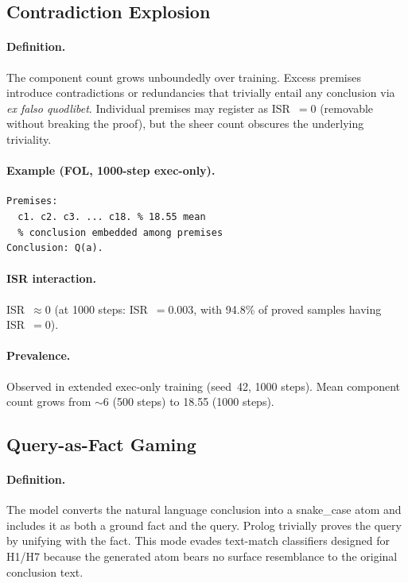 \subsection{Contradiction Explosion}

\paragraph{Definition.}
The component count grows unboundedly over training.
Excess premises introduce contradictions or redundancies that trivially entail any conclusion via \emph{ex falso quodlibet}.
Individual premises may register as ISR~$=0$ (removable without breaking the proof), but the sheer count obscures the underlying triviality.

\paragraph{Example (FOL, 1000-step exec-only).}
{\small\begin{verbatim}
Premises:
  c1. c2. c3. ... c18. % 18.55 mean
  % conclusion embedded among premises
Conclusion: Q(a).
\end{verbatim}}

\paragraph{ISR interaction.}
ISR~$\approx 0$ (at 1000 steps: ISR~$=0.003$, with 94.8\% of proved samples having ISR~$=0$).

\paragraph{Prevalence.}
Observed in extended exec-only training (seed~42, 1000 steps).
Mean component count grows from ${\sim}6$ (500 steps) to 18.55 (1000 steps).


\subsection{Query-as-Fact Gaming}

\paragraph{Definition.}
The model converts the natural language conclusion into a snake\_case atom and includes it as both a ground fact and the query.
Prolog trivially proves the query by unifying with the fact.
This mode evades text-match classifiers designed for H1/H7 because the generated atom bears no surface resemblance to the original conclusion text.

